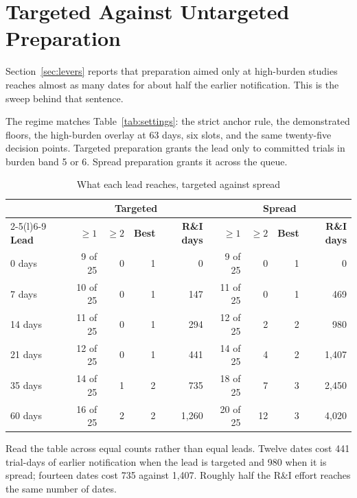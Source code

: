 
\chapter{Targeted Against Untargeted Preparation}
\label{app:targeted}

Section~\ref{sec:levers} reports that preparation aimed only at high-burden studies reaches almost as many dates for about half the earlier notification. This is the sweep behind that sentence.

The regime matches Table~\ref{tab:settings}: the strict anchor rule, the demonstrated floors, the high-burden overlay at 63 days, six slots, and the same twenty-five decision points. Targeted preparation grants the lead only to committed trials in burden band 5 or 6. Spread preparation grants it across the queue.

\begin{table}[htbp]
  \centering
  \caption{What each lead reaches, targeted against spread}
  \label{tab:targeted}
  \small
  \setlength{\tabcolsep}{4pt}
  \begin{tabular}{@{}lrrrrrrrr@{}}
    \toprule
    & \multicolumn{4}{c}{\textbf{Targeted}} & \multicolumn{4}{c}{\textbf{Spread}} \\
    \cmidrule(lr){2-5}\cmidrule(l){6-9}
    \textbf{Lead} & \textbf{$\geq 1$} & \textbf{$\geq 2$} & \textbf{Best} & \textbf{R\&I days}
                  & \textbf{$\geq 1$} & \textbf{$\geq 2$} & \textbf{Best} & \textbf{R\&I days} \\
    \midrule
    0 days  & 9 of 25  & 0 & 1 & 0     & 9 of 25  & 0  & 1 & 0 \\
    7 days  & 10 of 25 & 0 & 1 & 147   & 11 of 25 & 0  & 1 & 469 \\
    14 days & 11 of 25 & 0 & 1 & 294   & 12 of 25 & 2  & 2 & 980 \\
    21 days & 12 of 25 & 0 & 1 & 441   & 14 of 25 & 4  & 2 & 1,407 \\
    35 days & 14 of 25 & 1 & 2 & 735   & 18 of 25 & 7  & 3 & 2,450 \\
    60 days & 16 of 25 & 2 & 2 & 1,260 & 20 of 25 & 12 & 3 & 4,020 \\
    \bottomrule
  \end{tabular}
\end{table}

Read the table across equal counts rather than equal leads. Twelve dates cost 441 trial-days of earlier notification when the lead is targeted and 980 when it is spread; fourteen dates cost 735 against 1,407. Roughly half the R\&I effort reaches the same number of dates.

